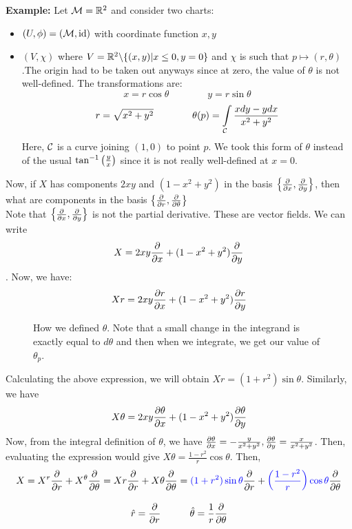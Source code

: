 \textbf{Example:} Let $\mathcal M = \mathbb{R}^2$ and consider two charts:
\begin{itemize}
\item $(U,\phi) = (\mathcal M, \mathrm{id})$ with coordinate function $x,y$
\item $(V,\chi)$  where $V = \mathbb{R}^2 \backslash \{(x,y)| x\leq 0, y=0\}$ and $\chi$ is such that $p \mapsto (r,\theta)$.The origin had to be taken out anyways since at zero, the value of $\theta$ is not well-defined. The transformations are:
$$x=r\cos\theta \qquad\qquad y = r\sin\theta$$
$$r= \sqrt{x^2+y^2}\qquad\qquad \theta(p) = \int\limits_{\mathcal C} \frac{xdy-ydx}{x^2+y^2}$$
Here, $\mathcal C$ is a curve joining $(1,0)$ to point $p$. We took this form of $\theta$ instead of the usual $\tan^{-1}\qty(\frac{y}{x})$ since it is not really well-defined at $x=0$.
\end{itemize} 
Now, if ${X}$ has components $2xy$ and $(1-x^2+y^2)$ in the basis $\qty{\pdv{x},\pdv{y}}$, then what are components in the basis $\qty{\pdv{r},\pdv{\theta}}$\\[0.2cm]
Note that $\qty{\pdv{x},\pdv{y}}$ is not the partial derivative. These are vector fields. We can write $$X = 2xy\pdv{x} + (1-x^2+y^2)\pdv{y}$$. Now, we have:
$$Xr =2xy\pdv{r}{x} + (1-x^2+y^2)\pdv{r}{y} $$
\begin{figure}[H]
  \centering
  
  \caption{How we defined $\theta$. Note that a small change in the integrand is exactly equal to $d\theta$ and then when we integrate, we get our value of $\theta_p$. }
\end{figure}
Calculating the above expression, we will obtain $Xr = (1+r^2)\sin\theta$. Similarly, we have $$X\theta =2xy\pdv{\theta}{x} + (1-x^2+y^2)\pdv{\theta}{y} $$
Now, from the integral definition of $\theta$, we have $\pdv{\theta}{x} = -\frac{y}{x^2+y^2}, \pdv{\theta}{y} = \frac{x}{x^2+y^2}$. Then, evaluating the expression would give $X\theta = \frac{1-r^2}{r}\cos\theta$. Then,
$$X = X^r \pdv{r} + X^\theta \pdv{\theta} = Xr \pdv{r} + X\theta \pdv{\theta} = \mathcolor{blue}{(1+r^2)\sin\theta} \pdv{r}+\mathcolor{blue}{\qty(\frac{1-r^2}{r})\cos\theta}\pdv{\theta}$$
\begin{ffact}
$$\hat{r} = \pdv{r}  \quad\quad\quad \hat{\theta} = \frac{1}{r}\pdv{\theta}$$ 
\end{ffact}


